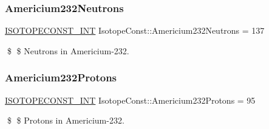 \subsubsection{\texorpdfstring{Americium232\+Neutrons}{Americium232Neutrons}}
{\footnotesize\ttfamily \mbox{\hyperlink{group___isotope_const-_macros_ga5f18360b3e99483a35c32d789e62621c}{I\+S\+O\+T\+O\+P\+E\+C\+O\+N\+S\+T\+\_\+\+I\+NT}} Isotope\+Const\+::\+Americium232\+Neutrons = 137}

\$ \$ Neutrons in Americium-\/232. \mbox{\label{group___isotope_const-_americium-_am232_ga3189236d7f3775d11ef512e8a1848aef}} 
\subsubsection{\texorpdfstring{Americium232\+Protons}{Americium232Protons}}
{\footnotesize\ttfamily \mbox{\hyperlink{group___isotope_const-_macros_ga5f18360b3e99483a35c32d789e62621c}{I\+S\+O\+T\+O\+P\+E\+C\+O\+N\+S\+T\+\_\+\+I\+NT}} Isotope\+Const\+::\+Americium232\+Protons = 95}

\$ \$ Protons in Americium-\/232. 